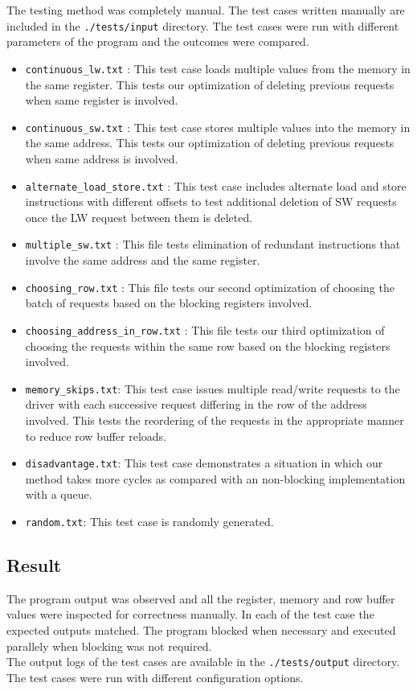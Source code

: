 \documentclass[hidelinks,12pt]{article}
\begin{document}
The testing method was completely manual. The test cases written manually are included in the \verb|./tests/input| directory. The test cases were run with different parameters
of the program and the outcomes were compared.
\begin{itemize}
    \item \verb|continuous_lw.txt| : This test case loads multiple values from the memory in the same register. This tests our optimization of deleting previous requests when same register is involved.
    \item \verb|continuous_sw.txt| : This test case stores multiple values into the memory in the same address. This tests our optimization of deleting previous requests when same address is involved.
    \item \verb|alternate_load_store.txt| : This test case includes alternate load and store instructions with different offsets to test additional deletion of SW requests once the LW request between them is deleted.
    \item \verb|multiple_sw.txt| : This file tests elimination of redundant instructions that involve the same address and the same register.
    \item \verb|choosing_row.txt| : This file tests our second optimization of choosing the batch of requests based on the blocking registers involved.
    \item \verb|choosing_address_in_row.txt| : This file tests our third optimization of choosing the requests within the same row based on the blocking registers involved.
    \item \verb|memory_skips.txt|: This test case issues multiple read/write requests to the driver with each successive request differing in the row of the address involved. This tests the reordering of the requests in the appropriate manner to reduce row buffer reloads.
    \item \verb|disadvantage.txt|: This test case demonstrates a situation in which our method takes more cycles as compared with an non-blocking implementation with a queue.
    \item \verb|random.txt|: This test case is randomly generated.
\end{itemize}

\subsection{Result}
The program output was observed and all the register, memory and row buffer values were inspected for correctness manually. In each of the test case the expected outputs matched. The program blocked when necessary and executed parallely when blocking was not required.\\[0.2cm]
The output logs of the test cases are available in the \verb|./tests/output| directory. The test cases were run with different configuration options.
\end{document}
